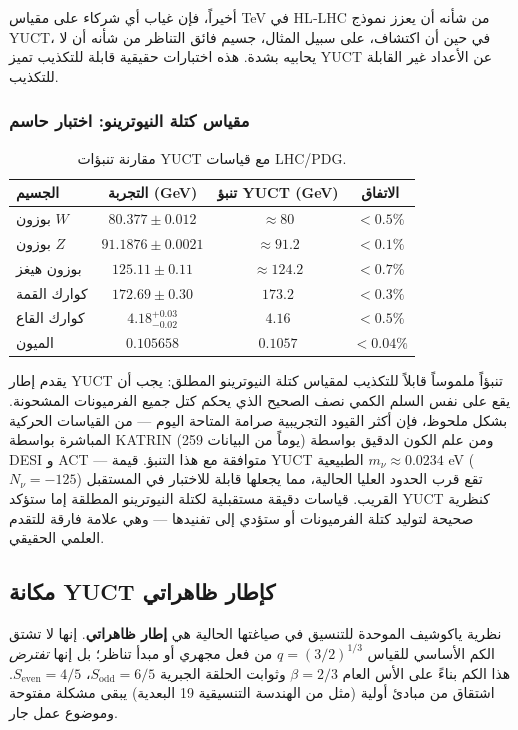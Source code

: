 \documentclass[11pt,a4paper]{article}
\begin{document}
	أخيراً، فإن غياب أي شركاء على مقياس TeV في HL‑LHC من شأنه أن يعزز نموذج YUCT، في حين أن اكتشاف، على سبيل المثال، جسيم فائق التناظر من شأنه أن لا يحابيه بشدة. هذه اختبارات حقيقية قابلة للتكذيب تميز YUCT عن الأعداد غير القابلة للتكذيب.
	
	\subsubsection{مقياس كتلة النيوترينو: اختبار حاسم}
	\begin{table}[h]
		\centering
		\caption{مقارنة تنبؤات YUCT مع قياسات LHC/PDG.}
		\normalsize
		\label{tab:lhc_comparison}
		\begin{tabular}{l c c c}
			\toprule
			الجسيم & التجربة (GeV) & تنبؤ YUCT (GeV) & الاتفاق \\
			\midrule
			بوزون $W$  & $80.377 \pm 0.012$ & $\approx 80$ & $<0.5\%$ \\
			بوزون $Z$  & $91.1876 \pm 0.0021$ & $\approx 91.2$ & $<0.1\%$ \\
			بوزون هيغز & $125.11 \pm 0.11$ & $\approx 124.2$ & $<0.7\%$ \\
			كوارك القمة  & $172.69 \pm 0.30$ & $173.2$ & $<0.3\%$ \\
			كوارك القاع & $4.18^{+0.03}_{-0.02}$ & $4.16$ & $<0.5\%$ \\
			الميون       & $0.105658$ & $0.1057$ & $<0.04\%$ \\
			\bottomrule
		\end{tabular}
	\end{table}
	
	يقدم إطار YUCT تنبؤاً ملموساً قابلاً للتكذيب لمقياس كتلة النيوترينو المطلق: يجب أن يقع على نفس السلم الكمي نصف الصحيح الذي يحكم كتل جميع الفرميونات المشحونة. بشكل ملحوظ، فإن أكثر القيود التجريبية صرامة المتاحة اليوم — من القياسات الحركية المباشرة بواسطة KATRIN (259 يوماً من البيانات) ومن علم الكون الدقيق بواسطة DESI و ACT — متوافقة مع هذا التنبؤ. قيمة YUCT الطبيعية $m_\nu \approx 0.0234$ eV ($N_\nu = -125$) تقع قرب الحدود العليا الحالية، مما يجعلها قابلة للاختبار في المستقبل القريب. قياسات دقيقة مستقبلية لكتلة النيوترينو المطلقة إما ستؤكد YUCT كنظرية صحيحة لتوليد كتلة الفرميونات أو ستؤدي إلى تفنيدها — وهي علامة فارقة للتقدم العلمي الحقيقي.
	
	\subsection*{مكانة YUCT كإطار ظاهراتي}
	
	نظرية ياكوشيف الموحدة للتنسيق في صياغتها الحالية هي \textbf{إطار ظاهراتي}. إنها لا تشتق الكم الأساسي للقياس \(q = (3/2)^{1/3}\) من فعل مجهري أو مبدأ تناظر؛ بل إنها \emph{تفترض} هذا الكم بناءً على الأس العام \(\beta = 2/3\) وثوابت الحلقة الجبرية \(S_{\mathrm{odd}}=6/5\)، \(S_{\mathrm{even}}=4/5\). اشتقاق من مبادئ أولية (مثل من الهندسة التنسيقية 19 البعدية) يبقى مشكلة مفتوحة وموضوع عمل جار.
	
\end{document}
